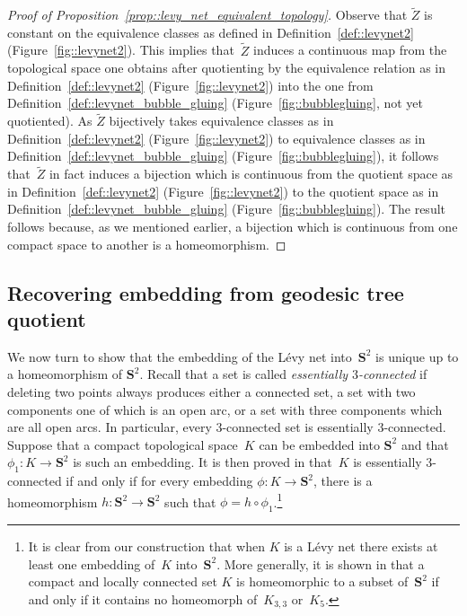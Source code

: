 \documentclass[10pt]{amsart}
\theoremstyle{plain}
\numberwithin{theorem}{section}
\theoremstyle{definition}
\renewcommand{\S}{{\mathbf S}}
\let\wt\widetilde
\begin{document}
\begin{proof}[Proof of Proposition~\ref{prop::levy_net_equivalent_topology}]
Observe that $\wt{Z}$ is constant on the equivalence classes as defined in Definition~\ref{def::levynet2} (Figure~\ref{fig::levynet2}). This implies that~$\wt{Z}$ induces a continuous map from the topological space one obtains after quotienting by the equivalence relation as in Definition~\ref{def::levynet2} (Figure~\ref{fig::levynet2}) into the one from Definition~\ref{def::levynet_bubble_gluing} (Figure~\ref{fig::bubblegluing}, not yet quotiented). As $\wt{Z}$ bijectively takes equivalence classes as in Definition~\ref{def::levynet2} (Figure~\ref{fig::levynet2}) to equivalence classes as in Definition~\ref{def::levynet_bubble_gluing} (Figure~\ref{fig::bubblegluing}), it follows that~$\wt{Z}$ in fact induces a bijection which is continuous from the quotient space as in Definition~\ref{def::levynet2} (Figure~\ref{fig::levynet2}) to the quotient space as in Definition~\ref{def::levynet_bubble_gluing} (Figure~\ref{fig::bubblegluing}). The result follows because, as we mentioned earlier, a bijection which is continuous from one compact space to another is a homeomorphism.
\end{proof}

\subsection{Recovering embedding from geodesic tree quotient}
\label{subsec::recovering_embedding}

We now turn to show that the embedding of the Lévy net into~$\S^2$ is unique up to a homeomorphism of $\S^2$. Recall that a set is called \emph{essentially $3$-connected} if deleting two points always produces either a connected set, a set with two components one of which is an open arc, or a set with three components which are all open arcs. In particular, every $3$-connected set is essentially $3$-connected. Suppose that a compact topological space~$K$ can be embedded into $\S^2$ and that $\phi_1 \colon K \to \S^2$ is such an embedding. It is then proved in \cite{3connectedembeduniquely} that~$K$ is essentially $3$-connected if and only if for every embedding $\phi \colon K \to \S^2$, there is a homeomorphism $h \colon \S^2 \to \S^2$ such that $\phi = h \circ \phi_1$.\footnote{It is clear from our construction that when $K$ is a Lévy net there exists at least one embedding of~$K$ into~$\S^2$. More generally, it is shown in \cite{planarityofcompactmetricspaces} that a compact and locally connected set $K$ is homeomorphic to a subset of~$\S^2$ if and only if it contains no homeomorph of~$K_{3,3}$ or~$K_5$.}
\end{document}
